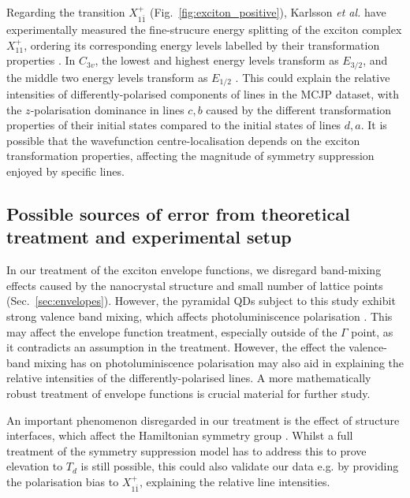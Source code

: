 Regarding the transition $X^+_{1\bar{1}}$ (Fig.~\ref{fig:exciton_positive}), Karlsson \textit{et al.} have experimentally measured the fine-strucure energy splitting of the exciton complex $X^+_{11}$, ordering its corresponding energy levels labelled by their transformation properties \cite[p.~16]{karlsson}. In $C_{3v}$, the lowest and highest energy levels transform as $E_{3/2}$, and the middle two energy levels transform as $E_{1/2}$ \cite[Fig.~17]{karlsson}. This could explain the relative intensities of differently-polarised components of lines in the MCJP dataset, with the $z$-polarisation dominance in lines $c,b$ caused by the different transformation properties of their initial states compared to the initial states of lines $d,a$. It is possible that the wavefunction centre-localisation depends on the exciton transformation properties, affecting the magnitude of symmetry suppression enjoyed by specific lines.

\subsection{Possible sources of error from theoretical treatment and experimental setup}

In our treatment of the exciton envelope functions, we disregard band-mixing effects caused by the nanocrystal structure and small number of lattice points (Sec.~\ref{sec:envelopes}). However, the pyramidal QDs subject to this study exhibit strong valence band mixing, which affects photoluminiscence polarisation \cite{strong_band_mixing}. This may affect the envelope function treatment, especially outside of the $\Gamma$ point, as it contradicts an assumption in the treatment. However, the effect the valence-band mixing has on photoluminiscence polarisation may also aid in explaining the relative intensities of the differently-polarised lines. A more mathematically robust treatment of envelope functions is crucial material for further study.

An important phenomenon disregarded in our treatment is the effect of structure interfaces, which affect the Hamiltonian symmetry group \cite{interfaces}. Whilst a full treatment of the symmetry suppression model has to address this to prove elevation to $T_d$ is still possible, this could also validate our data e.g. by providing the polarisation bias to $X^+_{1\bar{1}}$, explaining the relative line intensities.

